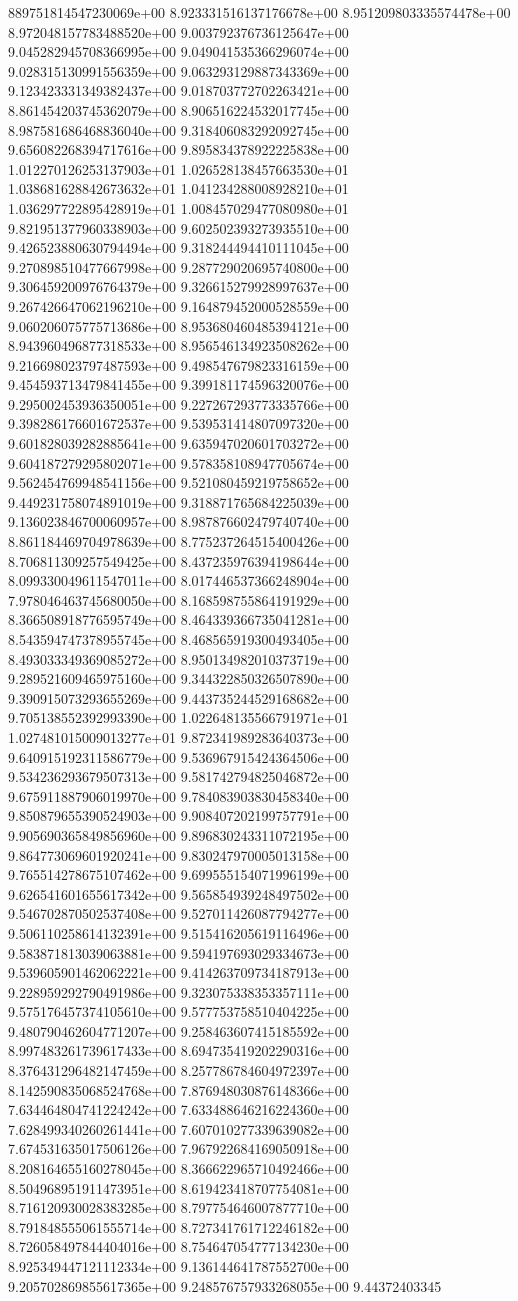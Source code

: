 889751814547230069e+00	8.923331516137176678e+00	8.951209803335574478e+00	8.972048157783488520e+00	9.003792376736125647e+00	9.045282945708366995e+00	9.049041535366296074e+00	9.028315130991556359e+00	9.063293129887343369e+00	9.123423331349382437e+00	9.018703772702263421e+00	8.861454203745362079e+00	8.906516224532017745e+00	8.987581686468836040e+00	9.318406083292092745e+00	9.656082268394717616e+00	9.895834378922225838e+00	1.012270126253137903e+01	1.026528138457663530e+01	1.038681628842673632e+01	1.041234288008928210e+01	1.036297722895428919e+01	1.008457029477080980e+01	9.821951377960338903e+00	9.602502393273935510e+00	9.426523880630794494e+00	9.318244494410111045e+00	9.270898510477667998e+00	9.287729020695740800e+00	9.306459200976764379e+00	9.326615279928997637e+00	9.267426647062196210e+00	9.164879452000528559e+00	9.060206075775713686e+00	8.953680460485394121e+00	8.943960496877318533e+00	8.956546134923508262e+00	9.216698023797487593e+00	9.498547679823316159e+00	9.454593713479841455e+00	9.399181174596320076e+00	9.295002453936350051e+00	9.227267293773335766e+00	9.398286176601672537e+00	9.539531414807097320e+00	9.601828039282885641e+00	9.635947020601703272e+00	9.604187279295802071e+00	9.578358108947705674e+00	9.562454769948541156e+00	9.521080459219758652e+00	9.449231758074891019e+00	9.318871765684225039e+00	9.136023846700060957e+00	8.987876602479740740e+00	8.861184469704978639e+00	8.775237264515400426e+00	8.706811309257549425e+00	8.437235976394198644e+00	8.099330049611547011e+00	8.017446537366248904e+00	7.978046463745680050e+00	8.168598755864191929e+00	8.366508918776595749e+00	8.464339366735041281e+00	8.543594747378955745e+00	8.468565919300493405e+00	8.493033349369085272e+00	8.950134982010373719e+00	9.289521609465975160e+00	9.344322850326507890e+00	9.390915073293655269e+00	9.443735244529168682e+00	9.705138552392993390e+00	1.022648135566791971e+01	1.027481015009013277e+01	9.872341989283640373e+00	9.640915192311586779e+00	9.536967915424364506e+00	9.534236293679507313e+00	9.581742794825046872e+00	9.675911887906019970e+00	9.784083903830458340e+00	9.850879655390524903e+00	9.908407202199757791e+00	9.905690365849856960e+00	9.896830243311072195e+00	9.864773069601920241e+00	9.830247970005013158e+00	9.765514278675107462e+00	9.699555154071996199e+00	9.626541601655617342e+00	9.565854939248497502e+00	9.546702870502537408e+00	9.527011426087794277e+00	9.506110258614132391e+00	9.515416205619116496e+00	9.583871813039063881e+00	9.594197693029334673e+00	9.539605901462062221e+00	9.414263709734187913e+00	9.228959292790491986e+00	9.323075338353357111e+00	9.575176457374105610e+00	9.577753758510404225e+00	9.480790462604771207e+00	9.258463607415185592e+00	8.997483261739617433e+00	8.694735419202290316e+00	8.376431296482147459e+00	8.257786784604972397e+00	8.142590835068524768e+00	7.876948030876148366e+00	7.634464804741224242e+00	7.633488646216224360e+00	7.628499340260261441e+00	7.607010277339639082e+00	7.674531635017506126e+00	7.967922684169050918e+00	8.208164655160278045e+00	8.366622965710492466e+00	8.504968951911473951e+00	8.619423418707754081e+00	8.716120930028383285e+00	8.797754646007877710e+00	8.791848555061555714e+00	8.727341761712246182e+00	8.726058497844404016e+00	8.754647054777134230e+00	8.925349447121112334e+00	9.136144641787552700e+00	9.205702869855617365e+00	9.248576757933268055e+00	9.44372403345